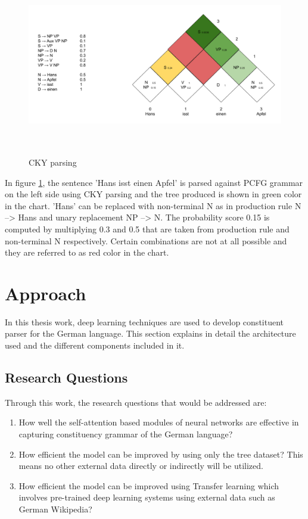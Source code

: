 \documentclass[a4paper, 11pt]{article}
\begin{document}
\begin{figure}[H]
    \centering
    \includegraphics[width=\textwidth,height=8cm,keepaspectratio=true]
    {cky-parsing-chart-2.png}
    \caption{
        CKY parsing
    }
    \label{fig:cky_parser_2}
\end{figure}

In figure \ref{fig:cky_parser_2}, the sentence 'Hans isst einen Apfel' is parsed against PCFG grammar on the left side using CKY parsing and the tree produced is shown in green color in the chart. 'Hans' can be replaced with non-terminal N as in production rule N --> Hans and unary replacement NP --> N. The probability score 0.15 is computed by multiplying 0.3 and 0.5 that are taken from production rule and non-terminal N respectively. Certain combinations are not at all possible and they are referred to as red color in the chart. 

\pagebreak
\section{Approach}  

In this thesis work, deep learning techniques are used to develop constituent parser for the German language. This section explains in detail the architecture used and the different components included in it. 

\subsection{Research Questions}

Through this work, the research questions that would be addressed are:
\begin{enumerate}
\item How well the self-attention based modules of neural networks are effective in capturing constituency grammar of the German language? 
\item How efficient the model can be improved by using only the tree dataset? This means no other external data directly or indirectly will be utilized. 
\item How efficient the model can be improved using Transfer learning which involves pre-trained deep learning systems using external data such as German Wikipedia?
\end{enumerate}
\end{document}

